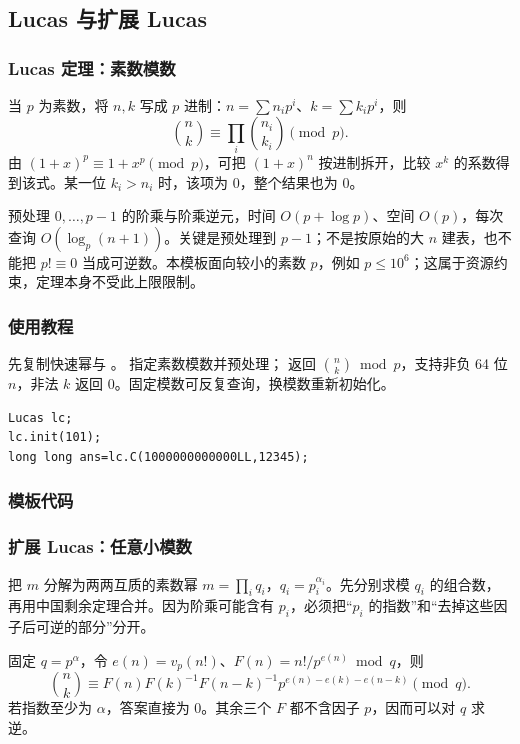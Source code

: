 \subsection{Lucas 与扩展 Lucas}
\label{algo:lucas}
\subsubsection*{Lucas 定理：素数模数}
当 $p$ 为素数，将 $n,k$ 写成 $p$ 进制：$n=\sum n_ip^i$、$k=\sum k_ip^i$，则
\[
    \binom nk\equiv\prod_i\binom{n_i}{k_i}\pmod p.
\]
由 $(1+x)^p\equiv1+x^p\pmod p$，可把 $(1+x)^n$ 按进制拆开，比较 $x^k$ 的系数得到该式。某一位 $k_i>n_i$ 时，该项为 $0$，整个结果也为 $0$。

预处理 $0,\ldots,p-1$ 的阶乘与阶乘逆元，时间 $O(p+\log p)$、空间 $O(p)$，每次查询 $O(\log_p(n+1))$。关键是预处理到 $p-1$；不是按原始的大 $n$ 建表，也不能把 $p!\equiv0$ 当成可逆数。本模板面向较小的素数 $p$，例如 $p\leq10^6$；这属于资源约束，定理本身不受此上限限制。

\subsubsection*{使用教程}
先复制快速幂与 。 指定素数模数并预处理； 返回 $\binom nk\bmod p$，支持非负 64 位 $n$，非法 $k$ 返回 0。固定模数可反复查询，换模数重新初始化。
\begin{lstlisting}[style=mtycpp,numbers=none]
Lucas lc;
lc.init(101);
long long ans=lc.C(1000000000000LL,12345);
\end{lstlisting}

\subsubsection*{模板代码}

\subsubsection*{扩展 Lucas：任意小模数}
把 $m$ 分解为两两互质的素数幂 $m=\prod_i q_i$，$q_i=p_i^{\alpha_i}$。先分别求模 $q_i$ 的组合数，再用中国剩余定理合并。因为阶乘可能含有 $p_i$，必须把“$p_i$ 的指数”和“去掉这些因子后可逆的部分”分开。

固定 $q=p^\alpha$，令 $e(n)=v_p(n!)$、$F(n)=n!/p^{e(n)}\bmod q$，则
\[
    \binom nk\equiv
    F(n)F(k)^{-1}F(n-k)^{-1}
    p^{e(n)-e(k)-e(n-k)}\pmod q.
\]
若指数至少为 $\alpha$，答案直接为 $0$。其余三个 $F$ 都不含因子 $p$，因而可以对 $q$ 求逆。

